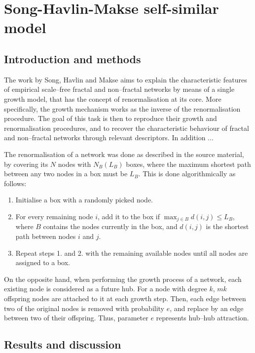 \chapter{Song-Havlin-Makse self-similar model}


\section{Introduction and methods}
 
The work by Song, Havlin and Makse \cite{song2006origins} aims to explain the characteristic features of empirical scale--free fractal and non--fractal networks by means of a single growth model, that has the concept of renormalisation at its core. More specifically, the growth mechanism works as the inverse of the renormalisation procedure. The goal of this task is then to reproduce their growth and renormalisation procedures, and to recover the characteristic behaviour of fractal and non--fractal networks through relevant descriptors. In addition ...

The renormalisation of a network was done as described in the source material, by covering its $N$ nodes with $N_B(L_B)$ boxes, where the maximum shortest path between any two nodes in a box must be $L_B$. This is done algorithmically as follows:

\begin{enumerate}
	\item Initialise a box with a randomly picked node.
	\item For every remaining node $i$, add it to the box if $\max_{j\in B} d(i,j) \leq L_B$, where $B$ contains the nodes currently in the box, and $d(i,j)$ is the shortest path between nodes $i$ and $j$.
	\item Repeat steps 1. and 2. with the remaining available nodes until all nodes are assigned to a box.
\end{enumerate}

On the opposite hand, when performing the growth process of a network, each existing node is considered as a future hub. For a node with degree $k$, $mk$ offspring nodes are attached to it at each growth step. Then, each edge between two of the original nodes is removed with probability $e$, and replace by an edge between two of their offspring. Thus, parameter $e$ represents hub--hub attraction.

\section{Results and discussion}

\lipsum[2-4]


\newpage